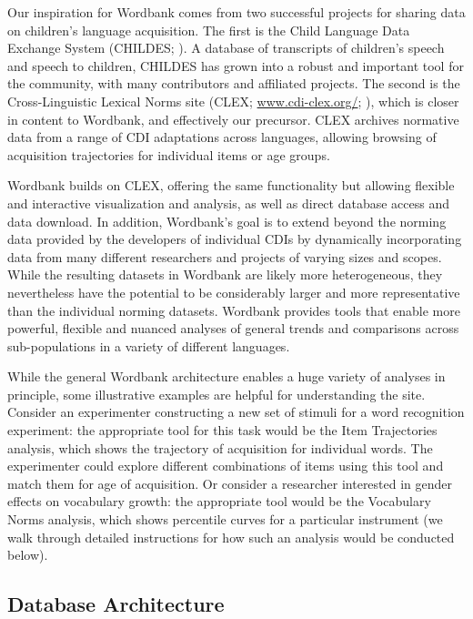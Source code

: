\documentclass[man,noapacite]{apa}
\begin{document}
Our inspiration for Wordbank comes from two successful projects for sharing data on children's language acquisition. The first is the Child Language Data Exchange System (CHILDES; ). A database of transcripts of children's speech and speech to children, CHILDES has grown into a robust and important tool for the community, with many contributors and affiliated projects. The second is the Cross-Linguistic Lexical Norms site (CLEX; \url{www.cdi-clex.org/}; ), which is closer in content to Wordbank, and effectively our precursor. CLEX archives normative data from a range of CDI adaptations across languages, allowing browsing of acquisition trajectories for individual items or age groups. 

Wordbank builds on CLEX, offering the same functionality but allowing flexible and interactive visualization and analysis, as well as direct database access and data download. In addition, Wordbank's goal is to extend beyond the norming data provided by the developers of individual CDIs by dynamically incorporating data from many different researchers and projects of varying sizes and scopes.  While the resulting datasets in Wordbank are likely more heterogeneous, they nevertheless have the potential to be considerably larger and more representative than the individual norming datasets.  Wordbank provides tools that enable more powerful, flexible and nuanced analyses of general trends and comparisons across sub-populations in a variety of different languages.

While the general Wordbank architecture enables a huge variety of analyses in principle, some illustrative examples are helpful for understanding the site. Consider an experimenter constructing a new set of stimuli for a word recognition experiment: the appropriate tool for this task would be the Item Trajectories analysis, which shows the trajectory of acquisition for individual words. The experimenter could explore different combinations of items using this tool and match them for age of acquisition. Or consider a researcher interested in gender effects on vocabulary growth: the appropriate tool would be the Vocabulary Norms analysis, which shows percentile curves for a particular instrument (we walk through detailed instructions for how such an analysis would be conducted below).

\subsection{Database Architecture}
\end{document}
